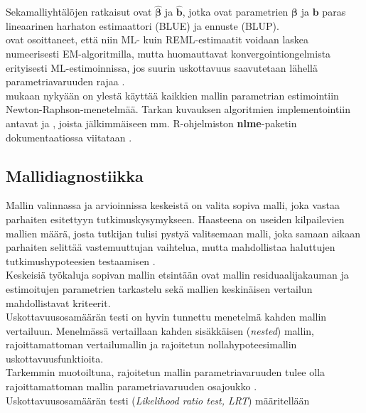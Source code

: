 \documentclass[finnish]{docopts}
\begin{document}
Sekamalliyhtälöjen ratkaisut ovat $\hat{\bm{\beta}}$ ja $\hat{\bm{b}}$, jotka ovat parametrien $\bm{\beta}$ ja $\bm{b}$ paras lineaarinen harhaton estimaattori (BLUE) ja ennuste (BLUP).\\

\cite{laird82} ovat osoittaneet, että niin ML- kuin REML-estimaatit voidaan laskea numeerisesti EM-algoritmilla, mutta huomauttavat konvergointiongelmista erityisesti ML-estimoinnissa, jos suurin uskottavuus saavutetaan lähellä parametriavaruuden rajaa \cite{verbeke00}.\\

\cite{verbeke00} mukaan nykyään on ylestä käyttää kaikkien mallin parametrian estimointiin Newton-Raphson-menetelmää. Tarkan kuvauksen algoritmien implementointiin antavat \cite{lindstrom88} ja \cite{lindstrom90}, joista jälkimmäiseen mm. R-ohjelmiston \textbf{nlme}-paketin dokumentaatiossa viitataan \cite{nlme13}.\\

\subsection{Mallidiagnostiikka}
\label{sub:mallidiag}

Mallin valinnassa ja arvioinnissa keskeistä on valita sopiva malli, joka vastaa parhaiten esitettyyn tutkimuskysymykseen. Haasteena on useiden kilpailevien mallien määrä, josta tutkijan tulisi pystyä valitsemaan malli, joka samaan aikaan parhaiten selittää vastemuuttujan vaihtelua, mutta mahdollistaa haluttujen tutkimushypoteesien testaamisen \cite{west14}.\\

Keskeisiä työkaluja sopivan mallin etsintään ovat mallin residuaalijakauman ja estimoitujen parametrien tarkastelu sekä mallien keskinäisen vertailun mahdollistavat kriteerit.\\

Uskottavuusosamäärän testi on hyvin tunnettu menetelmä kahden mallin vertailuun. Menelmässä vertaillaan kahden sisäkkäisen (\textit{nested}) mallin, rajoittamattoman vertailumallin ja rajoitetun nollahypoteesimallin uskottavuusfunktioita.\\

Tarkemmin muotoiltuna, rajoitetun mallin parametriavaruuden tulee olla rajoittamattoman mallin parametriavaruuden osajoukko \cite{west14}.\\

Uskottavuusosamäärän testi (\textit{Likelihood ratio test, LRT}) määritellään
\end{document}
